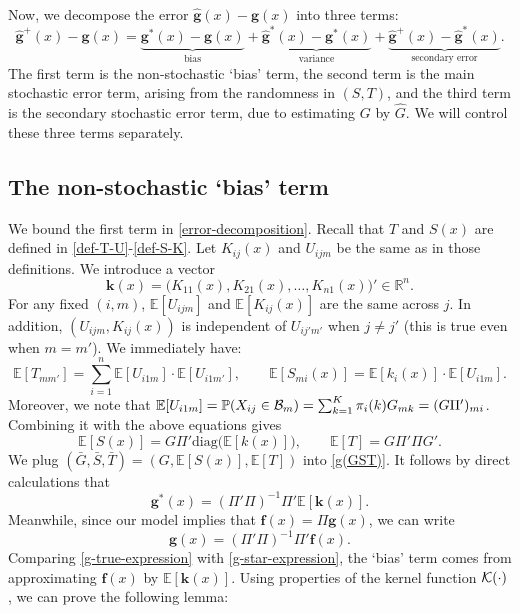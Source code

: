 \documentclass[preprint,11pt]{article}
\newcommand{\mbb}{\mathbb}
\newcommand{\bg}{{\boldsymbol g}}
\numberwithin{equation}{section}
\newcommand{\beq}{\begin{equation}}
\newcommand{\eeq}{\end{equation}}
\newcommand{\diag}{\mathrm{diag}}
\begin{document}
Now, we decompose the error $\widehat{\boldsymbol g}(x)-{\boldsymbol g}(x)$ into three terms: 
\beq \label{error-decomposition}
\widehat{\boldsymbol g}^+(x)-{\boldsymbol g}(x) = \underbrace{{\boldsymbol g}^*(x)-{\boldsymbol g}(x)}_{\text{bias}} + \underbrace{\widehat{\boldsymbol g}^*(x)-{\boldsymbol g}^*(x)}_{\text{variance}} + \underbrace{\widehat{\boldsymbol g}^+(x)-\widehat{\boldsymbol g}^*(x)}_{\text{secondary error}}. 
\eeq
The first term is the non-stochastic `bias' term, 
the second term is the main stochastic error term, arising from the randomness in $(S, T)$, and the third term is the secondary stochastic error term, due to estimating $G$ by  $\widehat{G}$. We will control these three terms separately. 


\subsection{The non-stochastic `bias' term} \label{subsec:UBproof-bias}
We bound the first term in \eqref{error-decomposition}. Recall that $T$ and $S(x)$ are defined in \eqref{def-T-U}-\eqref{def-S-K}. Let $K_{ij}(x)$ and $U_{ijm}$ be the same as in those definitions. 
We introduce a vector
\beq \label{def-k(x)}
\bm{k}(x) = \bigl(K_{11}(x), K_{21}(x), \ldots, K_{n1}(x)\bigr)'\in\mathbb{R}^n.  
\eeq
For any fixed $(i, m)$, $\mathbb{E}[U_{ijm}]$ and $\mathbb{E}[K_{ij}(x)]$ are the same across $j$. In addition, $(U_{ijm}, K_{ij}(x))$ is independent of $U_{ij'm'}$ when $j\neq j'$ (this is true even when $m=m'$).  We immediately have:
\[
\mathbb{E}[T_{mm'}] = \sum_{i=1}^n \mathbb{E}[U_{i1m}]\cdot \mathbb{E}[U_{i1m'}], \qquad \mathbb{E}[S_{mi}(x)] = \mathbb{E}[k_i(x)]\cdot\mathbb{E}[U_{i1m}]. 
\]  
Moreover, we note that $
\mathbb{E}[U_{i1m}]=\mathbb{P}(X_{ij}\in {\cal B}_m)=\sum_{k=1}^{K}\pi_i(k)G_{mk} = (G\Pi')_{mi}$. 
Combining it with the above equations gives
\[
\mathbb{E}[S(x)] =G\Pi' \diag\bigl(\mbb{E}[k(x)]\bigr), \qquad \mathbb{E}[T] = G\Pi'\Pi G'. 
\]
We plug $(\bar{G}, \bar{S}, \bar{T})=(G, \mathbb{E}[S(x)], \mathbb{E}[T])$  into \eqref{g(GST)}. It follows by direct calculations that 
\beq \label{g-star-expression}
\bg^*(x)= (\Pi'\Pi)^{-1}\Pi'\mathbb{E}[{\boldsymbol k}(x)]. 
\eeq
Meanwhile, since our model implies that ${\boldsymbol f}(x)=\Pi {\boldsymbol g}(x)$, we can write 
\beq \label{g-true-expression}
{\boldsymbol g}(x)=(\Pi'\Pi)^{-1}\Pi'{\boldsymbol f}(x).
\eeq
Comparing \eqref{g-true-expression} with \eqref{g-star-expression}, the `bias' term comes from approximating ${\boldsymbol f}(x)$ by $\mathbb{E}[{\boldsymbol k}(x)]$. Using properties of the kernel function ${\cal K}(\cdot)$, we can prove the following lemma:   
\end{document}
